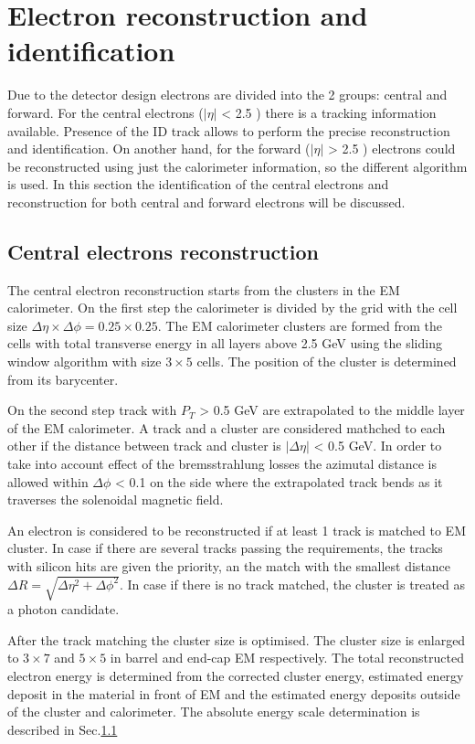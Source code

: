 \section{Electron reconstruction and identification}

Due to the detector design electrons are divided into the 2 groups: central and forward. For the central electrons ($| \eta |$ < 2.5 ) there is a tracking information available. Presence of the ID track allows to perform the precise reconstruction and identification. On another hand, for the forward  ($| \eta |$ > 2.5 ) electrons could be reconstructed using just the calorimeter information, so the different algorithm is used. In this section the identification of the central electrons and reconstruction for both central and forward electrons will be discussed.

\subsection{Central electrons reconstruction}
The central electron reconstruction starts from the clusters in the EM calorimeter. On the first step the calorimeter is divided by the grid with the cell size $\Delta \eta \times \Delta \phi = 0.25 \times 0.25$. The EM calorimeter clusters are formed from the cells with total transverse energy in all layers above 2.5 GeV using the sliding window algorithm with size $3\times5$ cells. The position of the cluster is determined from its barycenter.

On the second step track with $P_{T}$ > 0.5 GeV are extrapolated to the middle layer of the EM calorimeter. A track and a cluster are considered mathched to each other if the distance between track and cluster is $|\Delta\eta|$ < 0.5 GeV. In order to take into account effect of the bremsstrahlung losses the azimutal distance is allowed within $\Delta\phi$ < 0.1 on the side where the extrapolated track bends as it traverses the solenoidal magnetic field.

An electron is considered to be reconstructed if at least 1 track is matched to EM cluster. In case if there are several tracks passing the requirements, the tracks with silicon hits are given the priority, an the match with the smallest distance $\Delta R = \sqrt{\Delta\eta^2+\Delta\phi^2}$. In case if there is no track matched, the cluster is treated as a photon candidate.

After the track matching the cluster size is optimised. The cluster size is enlarged to $3\times7$ and $5\times5$ in barrel and end-cap EM respectively. The total reconstructed electron energy is determined from the corrected cluster energy, estimated energy deposit in the material in front of EM and the estimated energy deposits outside of the cluster and calorimeter. The absolute energy scale determination is described in Sec.\ref{}

